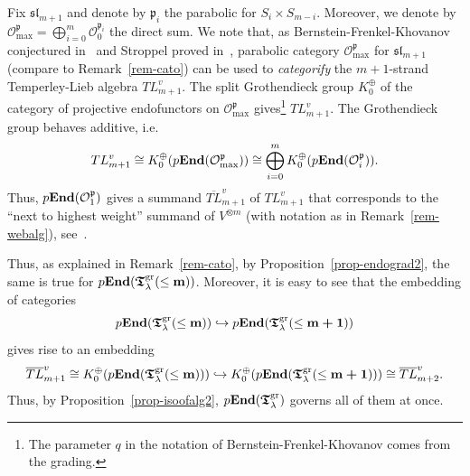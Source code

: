\begin{rem}\label{rem-grothendieck1}
Fix $\mathfrak{sl}_{m+1}$ and denote 
by $\mathfrak{p}_i$ the parabolic for 
$S_i\times S_{m-i}$. Moreover, we denote 
by $\mathcal O^{\mathfrak{p}}_{\mathrm{max}}=\bigoplus_{i=0}^m\mathcal O^{\mathfrak{p}_i}_{0}$ 
the direct sum. We note that, as Bernstein-Frenkel-Khovanov 
conjectured in~\cite[Conjectures~1-4]{bfk} and Stroppel proved 
in~\cite{st3}, parabolic category 
$\mathcal O^{\mathfrak{p}}_{\mathrm{max}}$ 
for $\mathfrak{sl}_{m+1}$ (compare to Remark~\ref{rem-cato}) 
can be used to \textit{categorify} the $m+1$-strand 
Temperley-Lieb algebra $TL^v_{m+1}$. The split 
Grothendieck group $K_0^{\oplus}$ of the category 
of projective endofunctors on 
$\mathcal O^{\mathfrak{p}}_{\mathrm{max}}$ gives\footnote{The parameter $q$ in the notation of Bernstein-Frenkel-Khovanov comes from the 
grading.} $TL^v_{m+1}$. 
The Grothendieck group behaves additive, i.e.
\[
TL^v_{m+1}\cong K_0^{\oplus}(p\boldsymbol{\mathrm{End}}(\mathcal O^{\mathfrak{p}}_{\mathrm{max}}))\cong \bigoplus_{i=0}^mK_0^{\oplus}(p\boldsymbol{\mathrm{End}}(\mathcal O^{\mathfrak{p}}_{i})).
\]
Thus, $p\boldsymbol{\mathrm{End}}(\mathcal O^{\mathfrak{p}}_{1})$ 
gives a summand $\overline{TL}^v_{m+1}$ of $TL^v_{m+1}$ 
that corresponds to the ``next to highest weight'' 
summand of $V^{\otimes m}$ (with notation as in 
Remark~\ref{rem-webalg}), see~\cite[Section~6]{chkh}.



Thus, as explained in Remark~\ref{rem-cato}, 
by Proposition~\ref{prop-endograd2}, the same 
is true for $p\boldsymbol{\mathrm{End}}(\boldsymbol{\mathfrak{T}}_{\lambda}^{\mathrm{gr}}(\leq\boldsymbol{\mathrm{m}}))$. Moreover, 
it is easy to see that the embedding of categories
\[
p\boldsymbol{\mathrm{End}}(\boldsymbol{\mathfrak{T}}_{\lambda}^{\mathrm{gr}}(\leq\boldsymbol{\mathrm{m}}))\hookrightarrow p\boldsymbol{\mathrm{End}}(\boldsymbol{\mathfrak{T}}_{\lambda}^{\mathrm{gr}}(\leq\boldsymbol{\mathrm{m}+1}))
\]
gives rise to an embedding
\[
\overline{TL}^v_{m+1}\cong K_0^{\oplus}(p\boldsymbol{\mathrm{End}}(\boldsymbol{\mathfrak{T}}_{\lambda}^{\mathrm{gr}}(\leq\boldsymbol{\mathrm{m}})))\hookrightarrow K_0^{\oplus}(p\boldsymbol{\mathrm{End}}(\boldsymbol{\mathfrak{T}}_{\lambda}^{\mathrm{gr}}(\leq\boldsymbol{\mathrm{m}+1})))\cong \overline{TL}^v_{m+2}.
\]
Thus, by Proposition~\ref{prop-isoofalg2}, $p\boldsymbol{\mathrm{End}}(\boldsymbol{\mathfrak{T}}_{\lambda}^{\mathrm{gr}})$ 
governs all of them at once.
\end{rem}